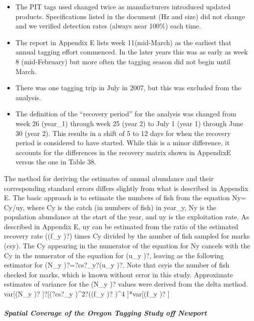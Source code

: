 \documentclass[11pt,
  english,
  letterpaper,
]{article}
\providecommand{\tightlist}{%
  \setlength{\itemsep}{0pt}\setlength{\parskip}{0pt}}
\providecommand{\tightlist}{%
  \setlength{\itemsep}{0pt}\setlength{\parskip}{0pt}}
\begin{document}
\begin{itemize}
\tightlist
\item
  The PIT tags used changed twice as manufacturers introduced updated products. Specifications listed in the document (Hz and size) did not change and we verified detection rates (always near 100\%) each time.
\item
  The report in Appendix E lists week 11(mid-March) as the earliest that annual tagging effort commenced. In the later years this was as early as week 8 (mid-February) but more often the tagging season did not begin until March.
\item
  There was one tagging trip in July in 2007, but this was excluded from the analysis.
\item
  The definition of the ``recovery period'' for the analysis was changed from week 26 (year\_1) through week 25 (year 2) to July 1 (year 1) through June 30 (year 2). This results in a shift of 5 to 12 days for when the recovery period is considered to have started. While this is a minor difference, it accounts for the differences in the recovery matrix shown in AppendixE versus the one in Table 38.
\end{itemize}

The method for deriving the estimates of annual abundance and their corresponding standard errors differs slightly from what is described in Appendix E. The basic approach is to estimate the numbers of fish from the equation Ny= Cy/uy, where Cy is the catch (in numbers of fish) in year\_y, Ny is the population abundance at the start of the year, and uy is the exploitation rate. As described in Appendix E, uy can be estimated from the ratio of the estimated recovery rate ((f\_y )?) times Cy divided by the number of fish sampled for marks (csy). The Cy appearing in the numerator of the equation for Ny cancels with the Cy in the numerator of the equation for (u\_y )?, leaving as the following estimator for (N\_y )?=?cs?\_y?(u\_y )?. Note that csyis the number of fish checked for marks, which is known without error in this study. Approximate estimates of variance for the (N\_y )? values were derived from the delta method. var{[}(N\_y )? {]}?{[}(?cs?\_y )\^{}2?((f\_y )? )\^{}4 {]}*var{[}(f\_y )? {]}

\hypertarget{spatial-coverage-of-the-oregon-tagging-study-off-newport}{%
\subparagraph{Spatial Coverage of the Oregon Tagging Study off Newport}\label{spatial-coverage-of-the-oregon-tagging-study-off-newport}}
\end{document}
